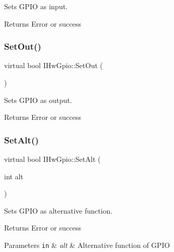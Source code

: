 Sets G\+P\+IO as input. 

\begin{DoxyReturn}{Returns}
Error or success 
\end{DoxyReturn}
\mbox{\label{classIHwGpio_aa0b016b46e6dab258d70eebd925940ec}} 
\subsubsection{\texorpdfstring{Set\+Out()}{SetOut()}}
{\footnotesize\ttfamily virtual bool I\+Hw\+Gpio\+::\+Set\+Out (\begin{DoxyParamCaption}{ }\end{DoxyParamCaption})\hspace{0.3cm}{\ttfamily [pure virtual]}}



Sets G\+P\+IO as output. 

\begin{DoxyReturn}{Returns}
Error or success 
\end{DoxyReturn}
\mbox{\label{classIHwGpio_a81bae8e12e617a82ca0a40d31b3d5972}} 
\subsubsection{\texorpdfstring{Set\+Alt()}{SetAlt()}}
{\footnotesize\ttfamily virtual bool I\+Hw\+Gpio\+::\+Set\+Alt (\begin{DoxyParamCaption}\item[{int}]{alt }\end{DoxyParamCaption})\hspace{0.3cm}{\ttfamily [pure virtual]}}



Sets G\+P\+IO as alternative function. 

\begin{DoxyReturn}{Returns}
Error or success 
\end{DoxyReturn}

\begin{DoxyParams}[1]{Parameters}
\mbox{\tt in}  & {\em alt} & Alternative function of G\+P\+IO \\
\hline
\end{DoxyParams}
\mbox{\label{classIHwGpio_a0b68a9811ec5e825d40067410e914867}} 
